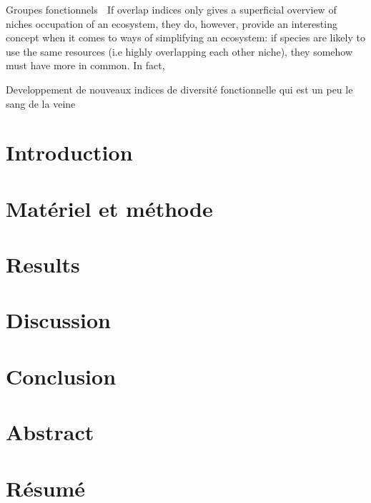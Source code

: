 \documentclass[a4paper, 12pt]{article}
\begin{document}
Groupes fonctionnels  If overlap indices only gives a superficial overview of niches occupation of an ecosystem, they do, however, provide an interesting concept when it comes to ways of simplifying an ecosystem: if species are likely to use the same resources (i.e highly overlapping each other niche), they somehow must have more in common. In fact, 

Developpement de nouveaux indices de diversité fonctionnelle \citep{albouy2011} qui est un peu le sang de la veine 

\section{Introduction}
\section{Matériel et méthode}
\section{Results}
\section{Discussion}
\section{Conclusion}




\section{Abstract}
\section{Résumé}
\end{document}
